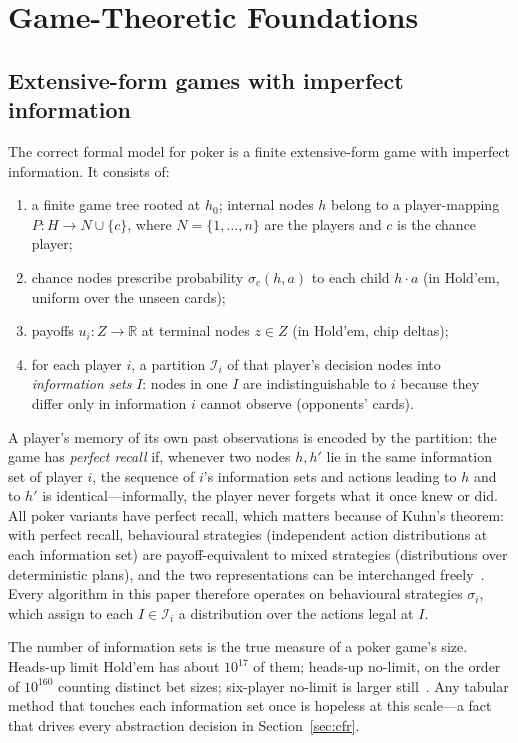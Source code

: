 \section{Game-Theoretic Foundations}\label{sec:gametheory}

\subsection{Extensive-form games with imperfect information}\label{sec:efg}

The correct formal model for poker is a finite extensive-form game with imperfect information. It consists of:
\begin{enumerate}[leftmargin=1.6em,itemsep=1pt]
\item a finite game tree rooted at $h_0$; internal nodes $h$ belong to a player-mapping $P: H \to N \cup \{c\}$, where $N = \{1, \dots, n\}$ are the players and $c$ is the chance player;
\item chance nodes prescribe probability $\sigma_c(h, a)$ to each child $h \cdot a$ (in Hold'em, uniform over the unseen cards);
\item payoffs $u_i: Z \to \mathbb{R}$ at terminal nodes $z \in Z$ (in Hold'em, chip deltas);
\item for each player $i$, a partition $\mathcal{I}_i$ of that player's decision nodes into \emph{information sets} $I$: nodes in one $I$ are indistinguishable to $i$ because they differ only in information $i$ cannot observe (opponents' cards).
\end{enumerate}
A player's memory of its own past observations is encoded by the partition: the game has \emph{perfect recall} if, whenever two nodes $h, h'$ lie in the same information set of player $i$, the sequence of $i$'s information sets and actions leading to $h$ and to $h'$ is identical---informally, the player never forgets what it once knew or did. All poker variants have perfect recall, which matters because of Kuhn's theorem: with perfect recall, behavioural strategies (independent action distributions at each information set) are payoff-equivalent to mixed strategies (distributions over deterministic plans), and the two representations can be interchanged freely~\cite{kuhn1953extensive}. Every algorithm in this paper therefore operates on behavioural strategies $\sigma_i$, which assign to each $I \in \mathcal{I}_i$ a distribution over the actions legal at $I$.

The number of information sets is the true measure of a poker game's size. Heads-up limit Hold'em has about $10^{17}$ of them; heads-up no-limit, on the order of $10^{160}$ counting distinct bet sizes; six-player no-limit is larger still~\cite{sandholm2015abstraction}. Any tabular method that touches each information set once is hopeless at this scale---a fact that drives every abstraction decision in Section~\ref{sec:cfr}.

